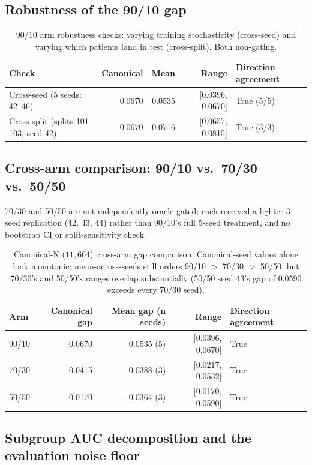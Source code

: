 \documentclass[11pt]{article}
\begin{document}
\subsection{Robustness of the 90/10 gap}

\begin{table}[H]
\centering
\begin{tabular}{lrrrl}
\toprule
Check & Canonical & Mean & Range & Direction agreement \\
\midrule
Cross-seed (5 seeds: 42--46) & 0.0670 & 0.0535 & [0.0396, 0.0670] & True (5/5) \\
Cross-split (splits 101--103, seed 42) & 0.0670 & 0.0716 & [0.0657, 0.0815] & True (3/3) \\
\bottomrule
\end{tabular}
\caption{90/10 arm robustness checks: varying training stochasticity (cross-seed) and varying which patients land in test (cross-split). Both non-gating.}
\label{tab:robustness}
\end{table}

\subsection{Cross-arm comparison: 90/10 vs.\ 70/30 vs.\ 50/50}

70/30 and 50/50 are not independently oracle-gated; each received a lighter 3-seed replication (42, 43, 44) rather than 90/10's full 5-seed treatment, and no bootstrap CI or split-sensitivity check.

\begin{table}[H]
\centering
\begin{tabular}{lrrrl}
\toprule
Arm & Canonical gap & Mean gap (n seeds) & Range & Direction agreement \\
\midrule
90/10 & 0.0670 & 0.0535 (5) & [0.0396, 0.0670] & True \\
70/30 & 0.0415 & 0.0388 (3) & [0.0217, 0.0532] & True \\
50/50 & 0.0170 & 0.0364 (3) & [0.0170, 0.0590] & True \\
\bottomrule
\end{tabular}
\caption{Canonical-N ($11{,}664$) cross-arm gap comparison. Canonical-seed values alone look monotonic; mean-across-seeds still orders 90/10 $>$ 70/30 $>$ 50/50, but 70/30's and 50/50's ranges overlap substantially (50/50 seed 43's gap of 0.0590 exceeds every 70/30 seed).}
\label{tab:crossarm}
\end{table}

\subsection{Subgroup AUC decomposition and the evaluation noise floor}
\end{document}
